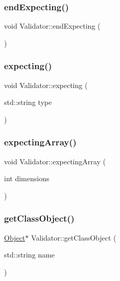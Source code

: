 \subsubsection{\texorpdfstring{end\+Expecting()}{endExpecting()}}
{\footnotesize\ttfamily void Validator\+::end\+Expecting (\begin{DoxyParamCaption}{ }\end{DoxyParamCaption})}

\mbox{\label{classValidator_a3dcf83a58eac283f4beef3a40d79f46f}} 
\subsubsection{\texorpdfstring{expecting()}{expecting()}}
{\footnotesize\ttfamily void Validator\+::expecting (\begin{DoxyParamCaption}\item[{std\+::string}]{type }\end{DoxyParamCaption})}

\mbox{\label{classValidator_ad6035a52a6e449b5a566fec27272751d}} 
\subsubsection{\texorpdfstring{expecting\+Array()}{expectingArray()}}
{\footnotesize\ttfamily void Validator\+::expecting\+Array (\begin{DoxyParamCaption}\item[{int}]{dimensions }\end{DoxyParamCaption})}

\mbox{\label{classValidator_afe99d9833e5cda3ab1aab764ab99d716}} 
\subsubsection{\texorpdfstring{get\+Class\+Object()}{getClassObject()}}
{\footnotesize\ttfamily \hyperlink{classObject}{Object}$\ast$ Validator\+::get\+Class\+Object (\begin{DoxyParamCaption}\item[{std\+::string}]{name }\end{DoxyParamCaption})}

